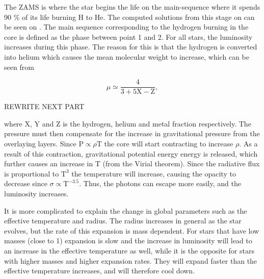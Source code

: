 The ZAMS is where the star begins the life on the main-sequence where it spends 90 \% of its life burning H to He. The computed solutions from this stage on can be seen on . The main sequence corresponding to the hydrogen burning in the core is defined as the phase between point 1 and 2. For all stars, the luminosity increases during this phase. The reason for this is that the hydrogen is converted into helium which causes the mean molecular weight to increase, which can be seen from

\begin{equation}
\label{meanmol}
\mu \simeq \frac{4}{3+5\text{X}-\text{Z}},
\end{equation}

REWRITE NEXT PART

\noindent where X, Y and Z is the hydrogen, helium and metal fraction respectively. The pressure must then compensate for the increase in gravitational pressure from the overlaying layers. Since $\text{P} \propto \rho \text{T}$ the core will start contracting to increase $\rho$. As a result of this contraction, gravitational potential energy energy is released, which further causes an increase in T (from the Virial theorem). Since the radiative flux is proportional to $\text{T}^{3}$ the temperature will increase, causing the opacity to decrease since $\sigma \propto \text{T}^{-3.5}$. Thus, the photons can escape more easily, and the luminosity increases. 

It is more complicated to explain the change in global parameters such as the effective temperature and radius. The radius increases in general as the star evolves, but the rate of this expansion is mass dependent. For stars that have low masses (close to 1\msun ) expansion is slow and the increase in luminosity will lead to an increase in the effective temperature as well, while it is the opposite for stars with higher masses and higher expansion rates. They will expand faster than the effective temperature increases, and will therefore cool down. 

